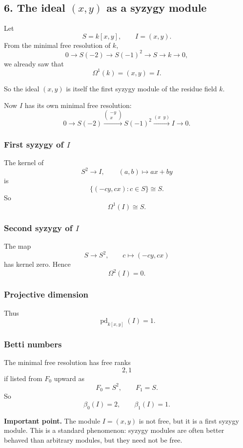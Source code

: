 \documentclass[12pt,a4paper]{article}
\theoremstyle{notespace}
\theoremstyle{definition}
\begin{document}
\subsection{6. The ideal \((x,y)\) as a syzygy module}

Let
\[
S=k[x,y], \qquad I=(x,y).
\]
From the minimal free resolution of \(k\),
\[
0 \longrightarrow S(-2) \longrightarrow S(-1)^2 \longrightarrow S \longrightarrow k \longrightarrow 0,
\]
we already saw that
\[
\Omega^1(k)=(x,y)=I.
\]

So the ideal \((x,y)\) is itself the first syzygy module of the residue field \(k\).

Now \(I\) has its own minimal free resolution:
\[
0 \longrightarrow S(-2) \xrightarrow{\begin{pmatrix}-y\\x\end{pmatrix}} S(-1)^2
\xrightarrow{(x\;\;y)} I \longrightarrow 0.
\]

\subsubsection*{First syzygy of \(I\)}

The kernel of
\[
S^2 \to I,\qquad (a,b)\mapsto ax+by
\]
is
\[
\{(-cy,cx):c\in S\}\cong S.
\]
So
\[
\Omega^1(I)\cong S.
\]

\subsubsection*{Second syzygy of \(I\)}

The map
\[
S\to S^2,\qquad c\mapsto (-cy,cx)
\]
has kernel zero.
Hence
\[
\Omega^2(I)=0.
\]

\subsubsection*{Projective dimension}

Thus
\[
\operatorname{pd}_{k[x,y]}(I)=1.
\]

\subsubsection*{Betti numbers}

The minimal free resolution has free ranks
\[
2,1
\]
if listed from \(F_0\) upward as
\[
F_0=S^2,\qquad F_1=S.
\]
So
\[
\beta_0(I)=2,\qquad \beta_1(I)=1.
\]

\medskip

\textbf{Important point.}
The module \(I=(x,y)\) is not free, but it is a first syzygy module.
This is a standard phenomenon: syzygy modules are often better behaved than arbitrary modules, but they need not be free.
\end{document}
